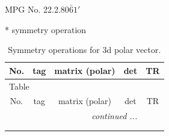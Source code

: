 \documentclass[fleqn,8pt]{jsarticle}
\begin{document}
\setcounter{MaxMatrixCols}{32}

\renewcommand{\tablename}{Table~}
\renewcommand{\figurename}{Figure~}
\begin{center}
\LARGE
MPG No. 22.2.80\quad$\bar{6}1'$
\end{center}
* symmetry operation
\renewcommand{\arraystretch}{1.3}
\begin{longtable}{ccccc}
\caption{Symmetry operations for 3d polar vector.}
 \\
 \hline \hline
No. & tag & matrix (polar) & det & TR \\ \hline \endfirsthead

\multicolumn{4}{l}{\tablename\ \thetable{}} \\
 \hline \hline
No. & tag & matrix (polar) & det & TR \\ \hline \endhead

 \hline \hline
\multicolumn{4}{r}{\footnotesize\it continued ...} \\ \endfoot

 \hline \hline
\multicolumn{4}{r}{} \\ \endlastfoot


\end{longtable}
\end{document}
